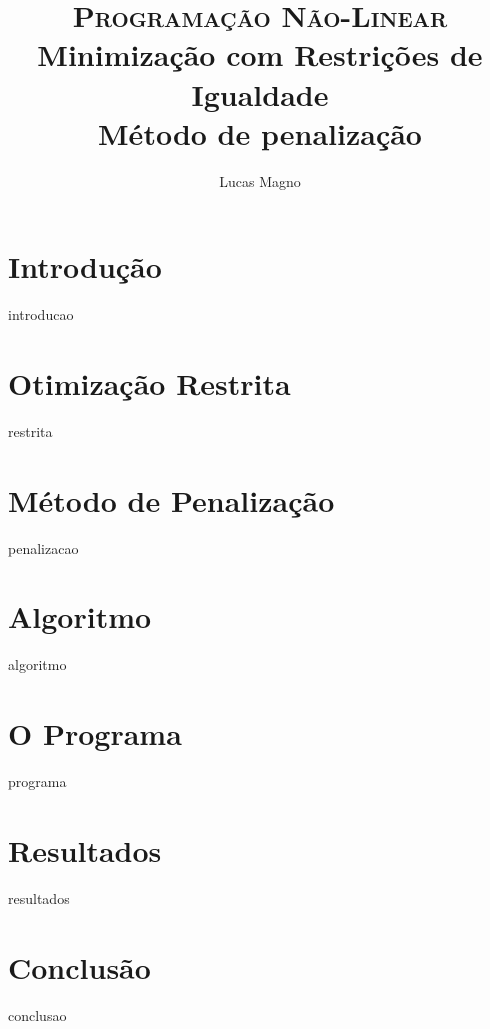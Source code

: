 \documentclass[paper=a4, fontsize=11pt]{scrartcl}	%
\title{
		\usefont{OT1}{bch}{b}{n}
		\normalfont \normalsize \textsc{Programação Não-Linear} \\ [25pt]
		\huge Minimização com Restrições de Igualdade \\
		\LARGE Método de penalização
}
\author{
		\normalfont 								\normalsize
        Lucas Magno\\[-3pt]		\normalsize
}
\date{}
\numberwithin{equation}{section}		%
\numberwithin{figure}{section}			%
\numberwithin{table}{section}			%
\numberwithin{definition}{section}
\numberwithin{theorem}{section}
\numberwithin{algorithm}{section}
\begin{document}
\maketitle

\section{Introdução}
	{introducao}

\section{Otimização Restrita}
	{restrita}

\newpage
\section{Método de Penalização}
	{penalizacao}

\newpage
\section{Algoritmo}
	{algoritmo}

\section{O Programa}
	{programa}

\newpage
\section{Resultados}
	{resultados}

\section{Conclusão}
	{conclusao}

\newpage

\end{document}
